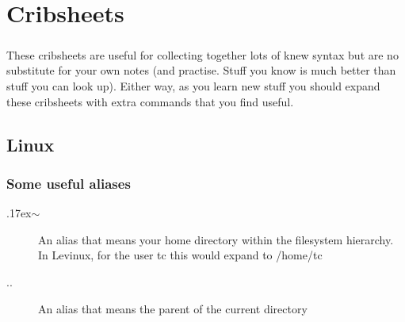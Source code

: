 \documentclass[12pt, a4paper, twoside]{book}
\begin{document}

\appendix
\chapter{Cribsheets}
\label{cribsheets}
\paragraph{} These cribsheets are useful for collecting together lots of knew syntax but are no substitute for your own notes (and practise. Stuff you know is much better than stuff you can look up). Either way, as you learn new stuff you should expand these cribsheets with extra commands that you find useful.

\section{Linux}
\label{cribsheet_linux}

\subsection{Some useful aliases}

\begin{description}
\item[{\raise.17ex\hbox{$\scriptstyle\sim$}}] An alias that means your home directory within the filesystem hierarchy. In Levinux, for the user tc this would expand to /home/tc
\item[..] An alias that means the parent of the current directory
\end{description}
\end{document}
